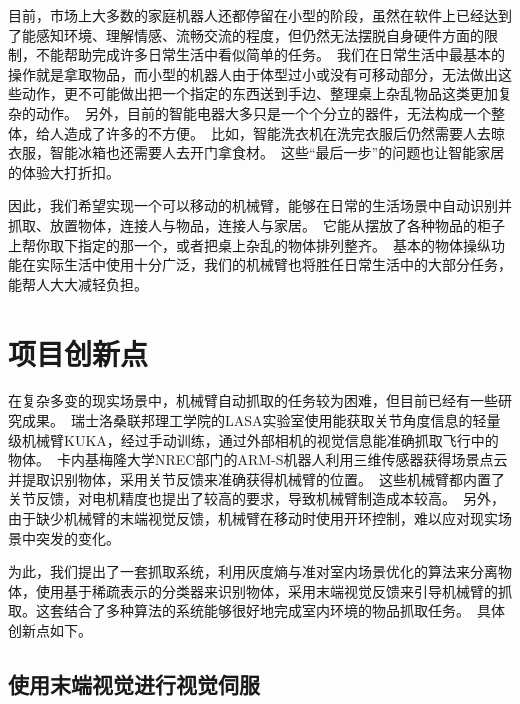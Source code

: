 目前，市场上大多数的家庭机器人还都停留在小型的阶段，虽然在软件上已经达到了能感知环境、理解情感、流畅交流的程度，但仍然无法摆脱自身硬件方面的限制，不能帮助完成许多日常生活中看似简单的任务。\ 我们在日常生活中最基本的操作就是拿取物品，而小型的机器人由于体型过小或没有可移动部分，无法做出这些动作，更不可能做出把一个指定的东西送到手边、整理桌上杂乱物品这类更加复杂的动作。\ 另外，目前的智能电器大多只是一个个分立的器件，无法构成一个整体，给人造成了许多的不方便。\ 比如，智能洗衣机在洗完衣服后仍然需要人去晾衣服，智能冰箱也还需要人去开门拿食材。\ 这些“最后一步”的问题也让智能家居的体验大打折扣。\ 

因此，我们希望实现一个可以移动的机械臂，能够在日常的生活场景中自动识别并抓取、放置物体，连接人与物品，连接人与家居。\ 它能从摆放了各种物品的柜子上帮你取下指定的那一个，或者把桌上杂乱的物体排列整齐。\ 基本的物体操纵功能在实际生活中使用十分广泛，我们的机械臂也将胜任日常生活中的大部分任务，能帮人大大减轻负担。\ 

\section{项目创新点}


在复杂多变的现实场景中，机械臂自动抓取的任务较为困难，但目前已经有一些研究成果。\ 瑞士洛桑联邦理工学院的LASA实验室使用能获取关节角度信息的轻量级机械臂KUKA，经过手动训练，通过外部相机的视觉信息能准确抓取飞行中的物体\cite{kim2014catching}。\ 卡内基梅隆大学NREC部门的ARM-S机器人利用三维传感器获得场景点云并提取识别物体，采用关节反馈来准确获得机械臂的位置\cite{nrec}。\ 这些机械臂都内置了关节反馈，对电机精度也提出了较高的要求，导致机械臂制造成本较高。\ 另外，由于缺少机械臂的末端视觉反馈，机械臂在移动时使用开环控制，难以应对现实场景中突发的变化。

为此，我们提出了一套抓取系统，利用灰度熵与准对室内场景优化的算法来分离物体，使用基于稀疏表示的分类器来识别物体，采用末端视觉反馈来引导机械臂的抓取。这套结合了多种算法的系统能够很好地完成室内环境的物品抓取任务。\ 具体创新点如下。

\subsection{使用末端视觉进行视觉伺服}


